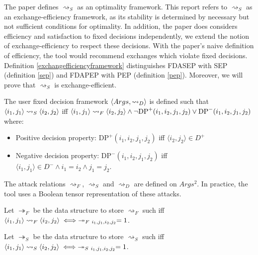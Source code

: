 The paper \cite{aes} defines $\rightsquigarrow_S$ as an optimality framework. This report refers to $\rightsquigarrow_S$ as an exchange-efficiency framework, as its stability is determined by necessary but not sufficient conditions for optimality. In addition, the paper does considers efficiency and satisfaction to fixed decisions independently, we extend the notion of exchange-efficiency to respect these decisions. With the paper's naive definition of efficiency, the tool would recommend exchanges which violate fixed decisions. Definition \ref{exchangefficiencyframework} distinguishes FDASEP with SEP (definition \ref{sep}) and FDAPEP with PEP (definition \ref{pep}). Moreover, we will prove that $\rightsquigarrow_S$ is exchange-efficient.

\begin{definition}
	\label{fixeddecisionframework}
	
	The user fixed decision framework $\langle{Args},{\rightsquigarrow_D}\rangle$ is defined such that $\langle{i_1},{j_1}\rangle\rightsquigarrow_S\langle{ i_2},{j_2}\rangle$ iff $\langle{i_1},{j_1}\rangle\rightsquigarrow_F\langle{i_2},{j_2}\rangle\land\neg\text{DP}^+(i_1,i_2,j_1,j_2)\lor\text{DP}^-(i_1,i_2,j_1,j_2)$ where:
	\begin{itemize}
		\item Positive decision property: $\text{DP}^+(i_1,i_2,j_1,j_2)$ iff $\langle i_2, j_2\rangle\in D^+$
		\item Negative decision property: $\text{DP}^-(i_1,i_2,j_1,j_2)$ iff $\langle i_1, j_1\rangle\in D^-\land i_1=i_2\land j_1=j_2$.
	\end{itemize}
\end{definition}

The attack relations $\rightsquigarrow_F$, $\rightsquigarrow_S$ and $\rightsquigarrow_D$ are defined on $Args^2$. In practice, the tool uses a Boolean tensor representation of these attacks.

\begin{definition}
	Let $\twoheadrightarrow_F$ be the data structure to store $\rightsquigarrow_F$ such iff $\pair{i_1}{j_1}\rightsquigarrow_F\pair{i_2}{j_2}\iff\twoheadrightarrow_{F\ i_1,j_1,i_2,j_2}=1$.
\end{definition}

\begin{definition}
	Let $\twoheadrightarrow_S$ be the data structure to store $\rightsquigarrow_S$ such iff $\pair{i_1}{j_1}\rightsquigarrow_S\pair{i_2}{j_2}\iff\twoheadrightarrow_{S\ i_1,j_1,i_2,j_2}=1$.
\end{definition}

